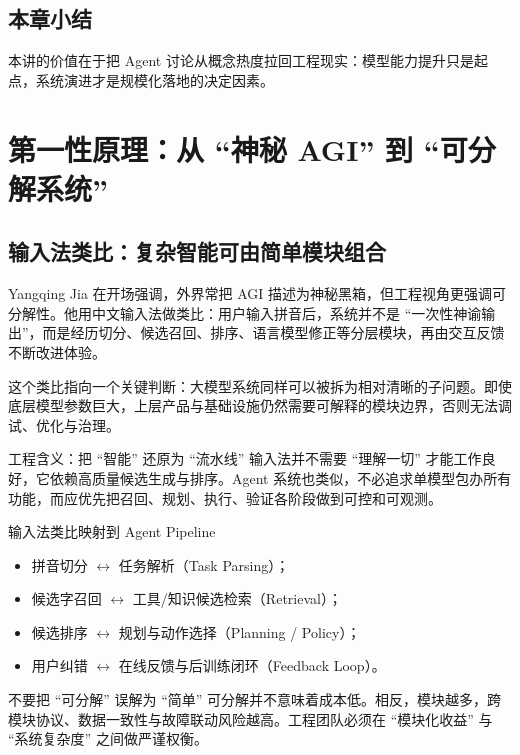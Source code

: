 \documentclass[a4paper]{article}
\begin{document}
\subsection{本章小结}
本讲的价值在于把 Agent 讨论从概念热度拉回工程现实：模型能力提升只是起点，系统演进才是规模化落地的决定因素。

\section{第一性原理：从 ``神秘 AGI'' 到 ``可分解系统''}

\subsection{输入法类比：复杂智能可由简单模块组合}
Yangqing Jia 在开场强调，外界常把 AGI 描述为神秘黑箱，但工程视角更强调可分解性。他用中文输入法做类比：用户输入拼音后，系统并不是 ``一次性神谕输出''，而是经历切分、候选召回、排序、语言模型修正等分层模块，再由交互反馈不断改进体验。

这个类比指向一个关键判断：大模型系统同样可以被拆为相对清晰的子问题。即使底层模型参数巨大，上层产品与基础设施仍然需要可解释的模块边界，否则无法调试、优化与治理。

\begin{importantbox}{工程含义：把 ``智能'' 还原为 ``流水线''}
输入法并不需要 ``理解一切'' 才能工作良好，它依赖高质量候选生成与排序。Agent 系统也类似，不必追求单模型包办所有功能，而应优先把召回、规划、执行、验证各阶段做到可控和可观测。
\end{importantbox}

\begin{knowledgebox}{输入法类比映射到 Agent Pipeline}
\begin{itemize}
    \item 拼音切分 $\leftrightarrow$ 任务解析（Task Parsing）；
    \item 候选字召回 $\leftrightarrow$ 工具/知识候选检索（Retrieval）；
    \item 候选排序 $\leftrightarrow$ 规划与动作选择（Planning / Policy）；
    \item 用户纠错 $\leftrightarrow$ 在线反馈与后训练闭环（Feedback Loop）。
\end{itemize}
\end{knowledgebox}

\begin{warningbox}{不要把 ``可分解'' 误解为 ``简单''}
可分解并不意味着成本低。相反，模块越多，跨模块协议、数据一致性与故障联动风险越高。工程团队必须在 ``模块化收益'' 与 ``系统复杂度'' 之间做严谨权衡。
\end{warningbox}
\end{document}
